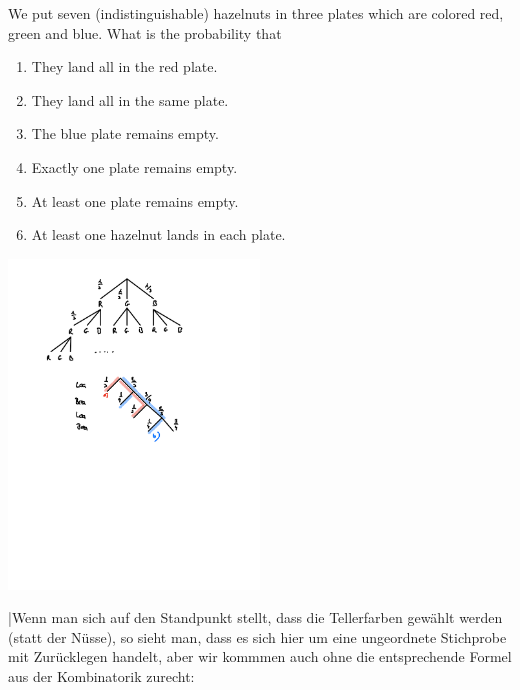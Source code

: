 \documentclass[twoside,11pt,a4paper]{article}
\newif\ifEN \ENtrue	                %
\def\tr|#1|#2|{\ifEN #2\else #1\fi}     %
\theoremstyle{definition}
\newcounter{exc}
\begin{document}
\begin{xxwrap}
\begin{exc}
\tr|Wir legen 7 (nicht unterscheidbare) Haselnüsse in 3 Teller mit den Farben Rot, Grün und Blau. Wie gross ist die 
    Wahrscheinlichkeit, dass
   |We put seven (indistinguishable) hazelnuts in three plates which are colored red, green and blue. What is the probability that |
\begin{enumerate}
\item \tr|Sie alle im roten Teller landen.|They land all in the red plate.|
\item \tr|Sie alle im gleichen Teller landen.|They land all in the same plate.|
\item \tr|Der blaue Teller leer bleibt.|The blue plate remains empty.|
\item \tr|Genau ein Teller leer bleibt.|Exactly one plate remains empty.|
\item \tr|Mindestens ein Teller bleibt leer.|At least one plate remains empty.|
\item \tr|Mindestens eine Haselnuss in jedem Teller landet.|At least one hazelnut lands in each plate.|
\end{enumerate}
\end{exc}
\begin{Answer}
  \begin{center}
\includegraphics[width=0.5\textwidth]{images/probability/SOL_Nuts.pdf}
\end{center}
  \tr|Wenn man sich auf den Standpunkt stellt, dass die Tellerfarben gewählt werden (statt der Nüsse), so sieht man, 
      dass es sich hier um eine ungeordnete Stichprobe mit Zurücklegen handelt, aber wir kommmen auch ohne die 
      entsprechende Formel aus der Kombinatorik zurecht: 

\end{Answer}
\end{xxwrap}
\end{document}
